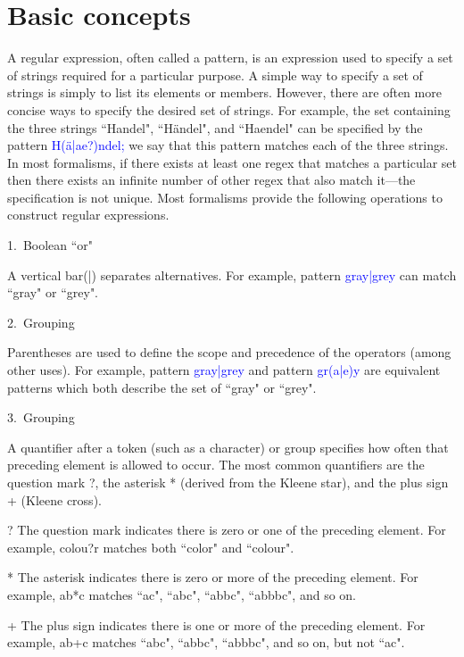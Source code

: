 \chapter{Basic concepts}


A regular expression, often called a \textsf{pattern}, is an expression used to specify a set of strings required for a particular purpose. A simple way to specify a set of strings is simply to list its elements or members. However, there are often more concise ways to specify the desired set of strings. For example, the set containing the three strings ``Handel", ``Händel", and ``Haendel" can be specified by the \textsf{pattern} \textcolor{Blue}{\textsf{H(ä|ae?)ndel;}} we say that this pattern \textsf{matches} each of the three strings. In most formalisms, if there exists at least one regex that matches a particular set then there exists an infinite number of other regex that also match it—the specification is not unique. Most formalisms provide the following operations to construct regular expressions.

\begin{compactitem}
\item[1.~\textsf{Boolean ``or"}]  

A vertical bar(\textsf{|}) separates alternatives. For example, \textsf{pattern} \textcolor{Blue}{\textsf{gray|grey}} can match ``\textsf{gray}" or ``\textsf{grey}".

\item[2.~\textsf{Grouping}]

Parentheses are used to define the scope and precedence of the operators (among other uses). For example, \textsf{pattern} \textcolor{Blue}{\textsf{gray|grey}} and \textsf{pattern} \textcolor{Blue}{\textsf{gr(a|e)y}} are equivalent patterns which both describe the set of ``gray" or ``grey".

\item[3.~\textsf{Grouping}]

A quantifier after a token (such as a character) or group specifies how often that preceding element is allowed to occur. The most common quantifiers are the question mark \textsf{?}, the asterisk \textsf{*} (derived from the Kleene star), and the plus sign \textsf{+} (Kleene cross).

\begin{compactitem}
\item[\textsf{?}] The question mark indicates there is zero or one of the preceding element. For example, \textsf{colou?r} matches both ``\textsf{color}" and ``\textsf{colour}".
\item[\textsf{*}] The asterisk indicates there is zero or more of the preceding element. For example, \textsf{ab*c} matches ``\textsf{ac}", ``\textsf{abc}", ``\textsf{abbc}", ``\textsf{abbbc}", and so on.
\item[\textsf{+}] The plus sign indicates there is one or more of the preceding element. For example, \textsf{ab+c} matches ``\textsf{abc}", ``\textsf{abbc}", ``\textsf{abbbc}", and so on, but not ``\textsf{ac}".
\end{compactitem}

\end{compactitem}


